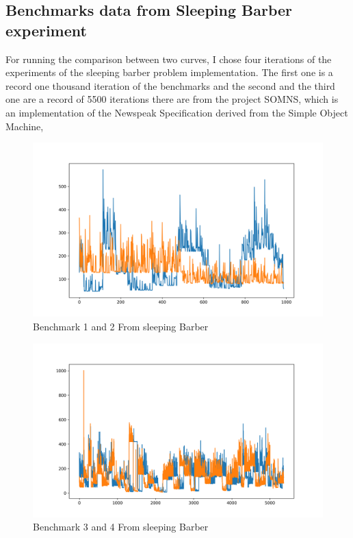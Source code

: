 \documentclass{article}
\begin{document}
\subsection{Benchmarks data from Sleeping Barber experiment}

For running the comparison between two curves, I chose four iterations of the experiments of the sleeping barber problem implementation. The first one is a record one thousand iteration of the benchmarks and the second and the third one are a record of 5500 iterations there are from the project SOMNS, which is an implementation of the Newspeak Specification derived from the Simple Object Machine,

\begin{figure}[h!]
    \centering
    \includegraphics[width=1\textwidth]{plot_0.png}
    \caption{Benchmark 1 and 2 From sleeping Barber}
    \label{fig:bench_1_2}
\end{figure}


\begin{figure}[h!]
    \centering
    \includegraphics[width=1\textwidth]{plot_1.png}
    \caption{Benchmark 3 and 4 From sleeping Barber}
    \label{fig:bench_2_3}
\end{figure}
\end{document}
